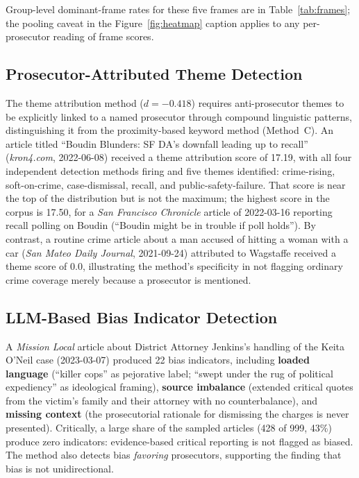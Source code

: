\documentclass[12pt, letterpaper]{article}
\begin{document}
\begin{appendices}
Group-level dominant-frame rates for these five frames are in Table~\ref{tab:frames}; the pooling caveat in the Figure~\ref{fig:heatmap} caption applies to any per-prosecutor reading of frame scores.

\subsection*{Prosecutor-Attributed Theme Detection}

The theme attribution method ($d = -0.418$) requires anti-prosecutor themes to be explicitly linked to a named prosecutor through compound linguistic patterns, distinguishing it from the proximity-based keyword method (Method~C). An article titled ``Boudin Blunders: SF DA's downfall leading up to recall'' (\emph{kron4.com}, 2022-06-08) received a theme attribution score of 17.19, with all four independent detection methods firing and five themes identified: crime-rising, soft-on-crime, case-dismissal, recall, and public-safety-failure. That score is near the top of the distribution but is not the maximum; the highest score in the corpus is 17.50, for a \emph{San Francisco Chronicle} article of 2022-03-16 reporting recall polling on Boudin (``Boudin might be in trouble if poll holds''). By contrast, a routine crime article about a man accused of hitting a woman with a car (\emph{San Mateo Daily Journal}, 2021-09-24) attributed to Wagstaffe received a theme score of 0.0, illustrating the method's specificity in not flagging ordinary crime coverage merely because a prosecutor is mentioned.

\subsection*{LLM-Based Bias Indicator Detection}

A \emph{Mission Local} article about District Attorney Jenkins's handling of the Keita O'Neil case (2023-03-07) produced 22 bias indicators, including \textbf{loaded language} (``killer cops'' as pejorative label; ``swept under the rug of political expediency'' as ideological framing), \textbf{source imbalance} (extended critical quotes from the victim's family and their attorney with no counterbalance), and \textbf{missing context} (the prosecutorial rationale for dismissing the charges is never presented). Critically, a large share of the sampled articles (428 of 999, 43\%) produce zero indicators: evidence-based critical reporting is not flagged as biased. The method also detects bias \emph{favoring} prosecutors, supporting the finding that bias is not unidirectional.


\end{appendices}
\end{document}
